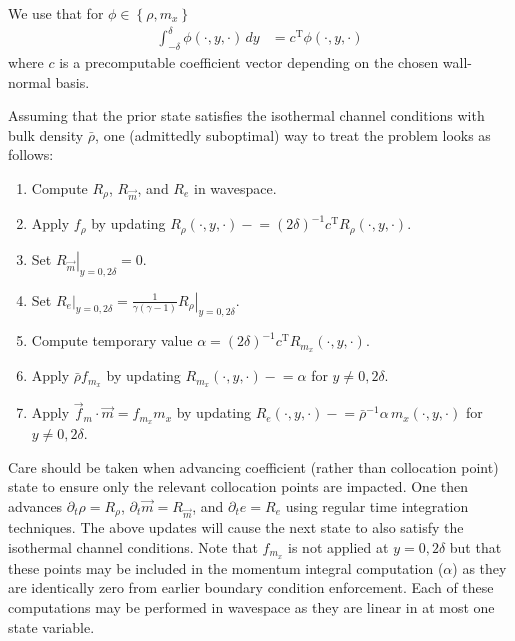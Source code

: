 \documentclass[letterpaper,11pt,nointlimits,reqno]{amsart}
\begin{document}
We use that for
$\phi\in\left\{\rho,m_{x}\right\}$
\begin{align}
  \int_{-\delta}^{\delta} \phi\!\left(\cdot,y,\cdot\right)\,dy
  &=
  c^{\mathrm{T}}\phi\!\left(\cdot,y,\cdot\right)
\end{align}
where $c$ is a precomputable coefficient vector depending on the chosen
wall-normal basis.

Assuming that the prior state satisfies the isothermal channel conditions with
bulk density $\bar{\rho}$, one (admittedly suboptimal) way to treat the
problem looks as follows:
\begin{enumerate}
  \item Compute $R_{\rho}$, $R_{\vec{m}}$, and $R_{e}$ in wavespace.
  \item Apply $f_{\rho}$ by updating $R_{\rho}\!\left(\cdot,y,\cdot\right)
        -\!= \left(2\delta\right)^{-1} c^{\mathrm{T}}
        R_{\rho}\!\left(\cdot,y,\cdot\right)$.
  \item Set $\left.R_{\vec{m}}\right|_{y=0,2\delta} = 0$.
  \item Set $\left.R_{e}\right|_{y=0,2\delta} =
        \frac{1}{\gamma\left(\gamma-1\right)}
        \left.R_{\rho}\right|_{y=0,2\delta}$.
  \item Compute temporary value $\alpha =
        \left(2\delta\right)^{-1} c^{\mathrm{T}}
        R_{m_{x}}\!\left(\cdot,y,\cdot\right)$.
  \item Apply $\bar{\rho} f_{m_x}$ by updating
        $R_{m_x}\!\left(\cdot,y,\cdot\right) -\!= \alpha$ for $y\neq0,2\delta$.
  \item Apply $\vec{f}_{m}\cdot\vec{m} = f_{m_x} m_x$ by updating
        $R_{e}\!\left(\cdot,y,\cdot\right) -\!=
        \bar{\rho}^{-1} \alpha \, m_{x}\!\left(\cdot,y,\cdot\right)$
        for $y\neq0,2\delta$.
\end{enumerate}
Care should be taken when advancing coefficient (rather than collocation point)
state to ensure only the relevant collocation points are impacted.  One then
advances $\partial_{t}\rho = R_{\rho}$, $\partial_{t} \vec{m} = R_{\vec{m}}$,
and $\partial_{t} e = R_{e}$ using regular time integration techniques.  The
above updates will cause the next state to also satisfy the isothermal channel
conditions.  Note that $f_{m_x}$ is not applied at $y=0,2\delta$ but that these
points may be included in the momentum integral computation ($\alpha$) as they
are identically zero from earlier boundary condition enforcement.  Each of
these computations may be performed in wavespace as they are linear in at most
one state variable.




\end{document}
